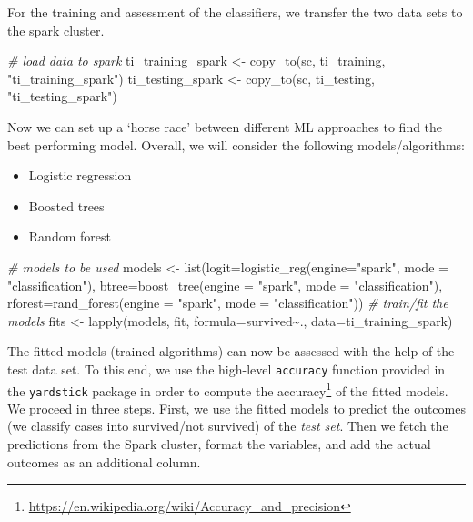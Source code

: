 \documentclass[
  12pt,
]{style/krantz}
\newenvironment{Shaded}{\begin{snugshade}}{\end{snugshade}}
\newcommand{\AttributeTok}[1]{\textcolor[rgb]{0.77,0.63,0.00}{#1}}
\newcommand{\CommentTok}[1]{\textcolor[rgb]{0.56,0.35,0.01}{\textit{#1}}}
\newcommand{\FunctionTok}[1]{\textcolor[rgb]{0.00,0.00,0.00}{#1}}
\newcommand{\NormalTok}[1]{#1}
\newcommand{\OtherTok}[1]{\textcolor[rgb]{0.56,0.35,0.01}{#1}}
\newcommand{\SpecialCharTok}[1]{\textcolor[rgb]{0.00,0.00,0.00}{#1}}
\newcommand{\StringTok}[1]{\textcolor[rgb]{0.31,0.60,0.02}{#1}}
\providecommand{\tightlist}{%
  \setlength{\itemsep}{0pt}\setlength{\parskip}{0pt}}
\renewcommand{\href}[2]{#2\footnote{\url{#1}}}
\begin{document}
For the training and assessment of the classifiers, we transfer the two data sets to the spark cluster.

\begin{Shaded}
\begin{Highlighting}[]
\CommentTok{\# load data to spark}
\NormalTok{ti\_training\_spark }\OtherTok{\textless{}{-}} \FunctionTok{copy\_to}\NormalTok{(sc, ti\_training, }\StringTok{"ti\_training\_spark"}\NormalTok{)}
\NormalTok{ti\_testing\_spark }\OtherTok{\textless{}{-}} \FunctionTok{copy\_to}\NormalTok{(sc, ti\_testing, }\StringTok{"ti\_testing\_spark"}\NormalTok{)}
\end{Highlighting}
\end{Shaded}

Now we can set up a `horse race' between different ML approaches to find the best performing model. Overall, we will consider the following models/algorithms:

\begin{itemize}
\tightlist
\item
  Logistic regression
\item
  Boosted trees
\item
  Random forest
\end{itemize}

\begin{Shaded}
\begin{Highlighting}[]
\CommentTok{\# models to be used}
\NormalTok{models }\OtherTok{\textless{}{-}} \FunctionTok{list}\NormalTok{(}\AttributeTok{logit=}\FunctionTok{logistic\_reg}\NormalTok{(}\AttributeTok{engine=}\StringTok{"spark"}\NormalTok{, }\AttributeTok{mode =} \StringTok{"classification"}\NormalTok{),}
               \AttributeTok{btree=}\FunctionTok{boost\_tree}\NormalTok{(}\AttributeTok{engine =} \StringTok{"spark"}\NormalTok{, }\AttributeTok{mode =} \StringTok{"classification"}\NormalTok{),}
               \AttributeTok{rforest=}\FunctionTok{rand\_forest}\NormalTok{(}\AttributeTok{engine =} \StringTok{"spark"}\NormalTok{, }\AttributeTok{mode =} \StringTok{"classification"}\NormalTok{))}
\CommentTok{\# train/fit the models}
\NormalTok{fits }\OtherTok{\textless{}{-}} \FunctionTok{lapply}\NormalTok{(models, fit, }\AttributeTok{formula=}\NormalTok{survived}\SpecialCharTok{\textasciitilde{}}\NormalTok{., }\AttributeTok{data=}\NormalTok{ti\_training\_spark)}
\end{Highlighting}
\end{Shaded}

The fitted models (trained algorithms) can now be assessed with the help of the test data set. To this end, we use the high-level \texttt{accuracy} function provided in the \texttt{yardstick} package in order to compute the \href{https://en.wikipedia.org/wiki/Accuracy_and_precision}{accuracy} of the fitted models. We proceed in three steps. First, we use the fitted models to predict the outcomes (we classify cases into survived/not survived) of the \emph{test set}. Then we fetch the predictions from the Spark cluster, format the variables, and add the actual outcomes as an additional column.
\end{document}
